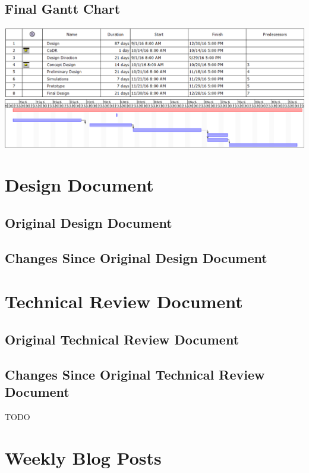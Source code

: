 \documentclass[letterpaper,10pt]{article}
\begin{document}
\subsection{Final Gantt Chart}
\includegraphics[width=\textwidth]{./images/gantttable}
\includegraphics[width=\textwidth]{./images/ganttchart}

\section{Design Document}
\subsection{Original Design Document}


\subsection{Changes Since Original Design Document}


\section{Technical Review Document}
\subsection{Original Technical Review Document}


\subsection{Changes Since Original Technical Review Document}
TODO


\section{Weekly Blog Posts}
\end{document}
